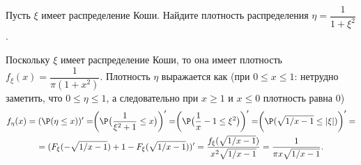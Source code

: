 \begin{problem}
    Пусть $\xi$ имеет распределение Коши.
    Найдите плотность распределения $\eta = \dfrac{1}{1 + \xi^2}$.
\end{problem}
\begin{solution}
    Поскольку $\xi$ имеет распределение Коши, то она имеет плотность $f_\xi(x) = \dfrac{1}{\pi(1 + x^2)}$.
    Плотность $\eta$ выражается как (при $0 \leq x \leq 1$: нетрудно заметить, что $0 \leq \eta \leq 1$, а следовательно при $x \geq 1$ и $x \leq 0$ плотность равна 0)
    \begin{multline*}
        f_{\eta}(x) = (\P(\eta \leq x))' = \biggr(\P\big(\dfrac{1}{\xi^2 + 1} \leq x\big)\biggr)' = \biggr(\P\big(\dfrac{1}{x} - 1 \leq \xi^2\big)\biggr)' = \biggr(\P(\sqrt{1/x - 1} \leq |\xi|)\biggr)' = \\ =
        (F_\xi(-\sqrt{1/x - 1}) + 1 - F_\xi(\sqrt{1/x - 1}))' = \dfrac{f_\xi(\sqrt{1/x - 1})}{x^2\sqrt{1/x - 1}} = \dfrac{1}{\pi x\sqrt {1/x - 1}}.
    \end{multline*}
\end{solution}